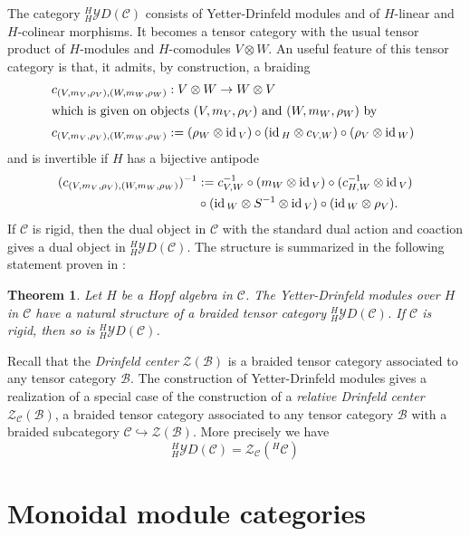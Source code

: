 \documentclass[11pt]{amsart}
\newcommand{\vc}{{\mathcal C}}
\newcommand{\YD}{{\mathcal YD}}
\newcommand{\id}{\mbox{\rm id\,}}
\renewcommand{\_}[1]{\mbox{$_{\left( #1 \right)}$}}
\theoremstyle{plain}
\numberwithin{equation}{section}
\newtheorem{teo}{Theorem}[section]
\theoremstyle{definition}
\theoremstyle{remark}
\theoremstyle{introTheorems}
\begin{document}
The category ${^H_H}\YD(\vc)$ consists of  Yetter-Drinfeld modules and of $H$-linear and $H$-colinear morphisms. It becomes a tensor category with the usual tensor product of $H$-modules and $H$-comodules $V\otimes W$. An useful feature of this tensor category is that, it admits, by construction, a braiding
\begin{align*}
     c_{(V, m_V, \rho_V), (W, m_W, \rho_W)} 
    &: V \otimes W \rightarrow W \otimes V \\
\intertext{which is given on objects $(V, m_V, \rho_V)$ and $(W, m_W, \rho_W)$ by}
     c_{(V, m_V, \rho_V), (W, m_W, \rho_W)} 
    &:= (\rho_W \otimes \id_V ) \circ (\id_H \otimes
    c_{V,W} ) \circ (\rho_V \otimes \id_W )\,\, \\
\end{align*}
and is invertible if $H$ has a bijective antipode
\begin{align*}
(c_{(V, m_V, \rho_V), (W, m_W, \rho_W)} )^{-1} 
&:= c^{-1}_{V,W} 
\circ (m_W \otimes \id_V ) \circ (c^{-1}_{H,W} \otimes \id_V ) \\
&\circ (\id_W \otimes S^{-1} \otimes \id_V ) \circ (\id_W \otimes \rho_V ).
\end{align*}
 If $\vc$ is rigid, then the dual object in $\vc$ with the standard dual action and coaction  gives a dual object in ${^H_H}\YD(\vc)$. The structure is summarized in the following statement proven in \cite{Besp95}:
\begin{teo}
Let $H$ be a Hopf algebra in $\vc$. 
The Yetter-Drinfeld modules over $H$ in $\vc$ have
a natural structure of a
braided tensor category ${^H_H}\YD(\vc)$. If $\vc$ is rigid, then so is ${^H_H}\YD(\vc)$.
\end{teo}

Recall that the \emph{Drinfeld center}  
$\mathcal{Z}(\mathcal{B})$ is a braided tensor category associated to any tensor category $\mathcal{B}$.
The construction of Yetter-Drinfeld modules gives a realization of a special case of the construction of a \emph{relative Drinfeld center}  
$\mathcal{Z}_\vc(\mathcal{B})$, a braided tensor category associated to any tensor category $\mathcal{B}$ with a braided subcategory $\vc\hookrightarrow \mathcal{Z}(\mathcal{B})$. More precisely we have 
$${^H_H}\YD(\vc)=\mathcal{Z}_\vc({^H}\vc)$$

\section{Monoidal module categories}
\end{document}
